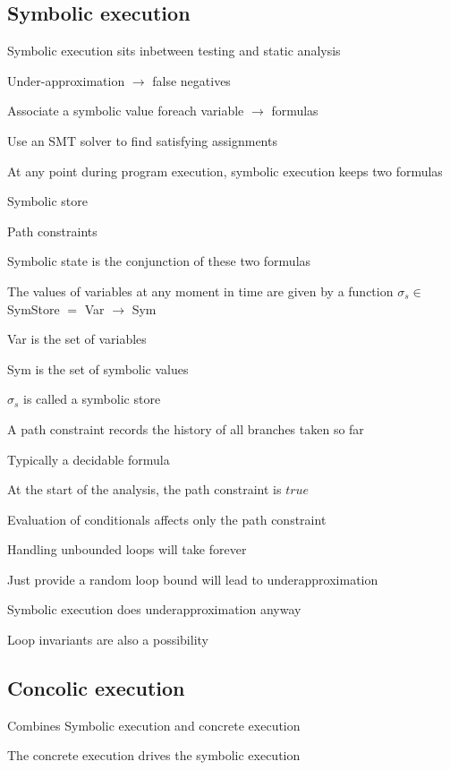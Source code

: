 \subsection{Symbolic execution}
\enumstart
	\item Symbolic execution sits inbetween testing and static analysis
	\item Under-approximation $\rightarrow$ false negatives
	\item Associate a symbolic value foreach variable $\rightarrow$ formulas
	\item Use an SMT solver to find satisfying assignments
	\item At any point during program execution, symbolic execution keeps two formulas
	\enumstart
		\item Symbolic store
		\item Path constraints
		\item Symbolic state is the conjunction of these two formulas
	\enumend
	\item The values of variables at any moment in time are given by a function $\sigma_s \in$ SymStore $=$ Var $\rightarrow$ Sym
	\enumstart
		\item Var is the set of variables
		\item Sym is the set of symbolic values
		\item $\sigma_s$ is called a symbolic store
	\enumend
	\item A path constraint records the history of all branches taken so far
	\enumstart
		\item Typically a decidable formula
		\item At the start of the analysis, the path constraint is $true$
		\item Evaluation of conditionals affects only the path constraint
	\enumend
	\item Handling unbounded loops will take forever
	\enumstart
		\item Just provide a random loop bound will lead to underapproximation
		\item Symbolic execution does underapproximation anyway
		\item Loop invariants are also a possibility
	\enumend
\enumend

\subsection{Concolic execution}
\enumstart
	\item Combines Symbolic execution and concrete execution
	\item The concrete execution drives the symbolic execution
\enumend